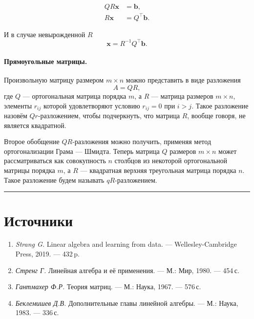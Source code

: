 \documentclass[11pt,a4paper]{article}
\providecommand{\tightlist}{%
      \setlength{\itemsep}{0pt}\setlength{\parskip}{0pt}}
\begin{document}
\[
\begin{aligned}
  QR \mathbf{x} &= \mathbf{b}, \\
  R \mathbf{x}  &= Q^\top \mathbf{b}.
\end{aligned}
\]

И в случае невырожденной \(R\) \[
  \mathbf{x} = R^{-1}Q^\top \mathbf{b}.
\]

    \hypertarget{ux43fux440ux44fux43cux43eux443ux433ux43eux43bux44cux43dux44bux435-ux43cux430ux442ux440ux438ux446ux44b}{%
\paragraph{Прямоугольные матрицы.} \label{ux43fux440ux44fux43cux43eux443ux433ux43eux43bux44cux43dux44bux435-ux43cux430ux442ux440ux438ux446ux44b}}

Произвольную матрицу размером \(m \times n\) можно представить в виде
разложения \[
  A = QR,
\] где \(Q\) --- ортогональная матрица порядка \(m\), а \(R\) ---
матрица размеров \(m \times n\), элементы \(r_{ij}\) которой
удовлетворяют условию \(r_{ij}=0\) при \(i>j\). Такое разложение назовём
\(Qr\)-разложением, чтобы подчеркнуть, что матрица \(R\), вообще говоря,
не является квадратной.

Второе обобщение \(QR\)-разложения можно получить, применяя метод
ортогонализации Грама --- Шмидта. Теперь матрица \(Q\) размеров
\(m \times n\) может рассматриваться как совокупность \(n\) столбцов из
некоторой ортогональной матрицы порядка \(m\), а \(R\) --- квадратная
верхняя треугольная матрица порядка \(n\). Такое разложение будем
называть \(qR\)-разложением.

    \begin{center}\rule{0.5\linewidth}{0.5pt}\end{center}

    \hypertarget{ux438ux441ux442ux43eux447ux43dux438ux43aux438}{%
\section{Источники}\label{ux438ux441ux442ux43eux447ux43dux438ux43aux438}}

\begin{enumerate}
\def\labelenumi{\arabic{enumi}.}
\tightlist
\item
  \emph{Strang G.} Linear algebra and learning from data. ---
  Wellesley-Cambridge Press, 2019. --- 432\,p.
\item
  \emph{Стренг Г.} Линейная алгебра и её применения. --- М.: Мир, 1980.
  --- 454\,с.
\item
  \emph{Гантмахер Ф.Р.} Теория матриц. --- М.: Наука, 1967. --- 576\,с.
\item
  \emph{Беклемишев Д.В.} Дополнительные главы линейной алгебры. --- М.:
  Наука, 1983. --- 336\,с.
\end{enumerate}


\end{document}
